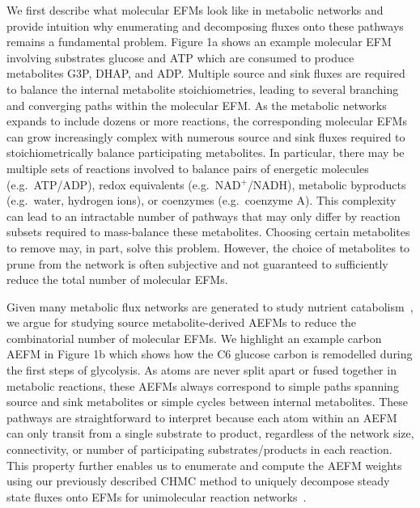 \documentclass[12pt]{article}
\begin{document}
We first describe what molecular EFMs look like in metabolic networks and
provide intuition why enumerating and decomposing fluxes onto these
pathways remains a fundamental problem. Figure 1a shows an
example molecular EFM involving substrates glucose and ATP which are
consumed to produce metabolites G3P, DHAP, and ADP. Multiple source and
sink fluxes are required to balance the internal metabolite
stoichiometries, leading to several branching and converging paths within
the molecular EFM. As the metabolic networks expands to include dozens or
more reactions, the corresponding molecular EFMs can grow increasingly
complex with numerous source and sink fluxes required to
stoichiometrically balance participating metabolites. In particular, there
may be multiple sets of reactions involved to balance pairs of energetic
molecules (e.g.\ ATP/ADP), redox equivalents (e.g.\ NAD$^+$/NADH), metabolic
byproducts (e.g.\ water, hydrogen ions), or coenzymes (e.g.\ coenzyme A).
This complexity can lead to an intractable number of pathways that may
only differ by reaction subsets required to mass-balance these
metabolites. Choosing certain metabolites to remove may, in part, solve
this problem. However, the choice of metabolites to prune from the network
is often subjective and not guaranteed to sufficiently reduce the total
number of molecular EFMs.

Given many metabolic flux networks are generated to study nutrient
catabolism~\citep{ZamboniNicola2015DtMS}, we argue for studying source
metabolite-derived AEFMs to reduce the combinatorial number of molecular
EFMs. We highlight an example carbon AEFM in Figure 1b which shows how
the C6 glucose carbon is remodelled during the first steps of glycolysis.
As atoms are never split apart or fused together in metabolic reactions,
these AEFMs always correspond to simple paths spanning source and sink
metabolites or simple cycles between internal metabolites. These pathways
are straightforward to interpret because each atom within an AEFM can only
transit from a single substrate to product, regardless of the network
size, connectivity, or number of participating substrates/products in each
reaction. This property further enables us to enumerate and compute the
AEFM weights using our previously described CHMC method to uniquely
decompose steady state fluxes onto EFMs for unimolecular reaction
networks~\citep{ChitpinJustinG2023AMct}.
\end{document}

